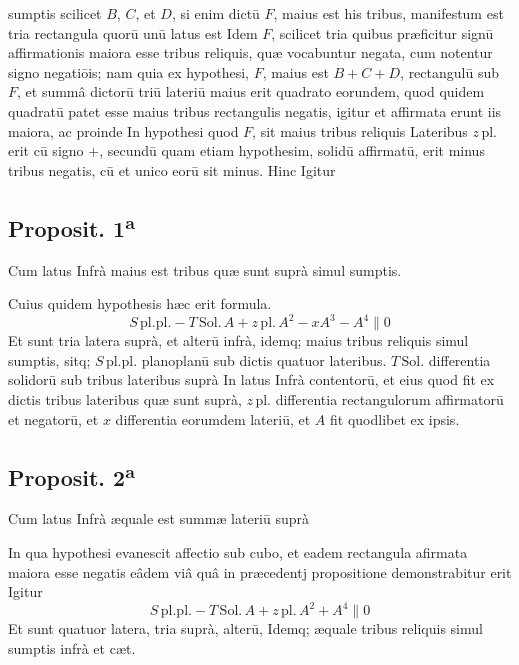 \documentclass[11pt,a4paper]{article}
\begin{document}

sumptis scilicet $B$, $C$, et $D$, si enim dictū $F$, maius est his tribus, manifestum est tria rectangula quorū unū latus est Idem $F$, scilicet tria quibus præficitur signū affirmationis maiora esse tribus reliquis, quæ vocabuntur negata, cum notentur signo negatiōis; nam quia ex hypothesi, $F$, maius est $B + C + D$, rectangulū sub $F$, et summâ dictorū triū lateriū maius erit quadrato eorundem, quod quidem quadratū patet esse maius tribus rectangulis negatis, igitur et affirmata erunt iis maiora, ac proinde In hypothesi quod $F$, sit maius tribus reliquis Lateribus $z\,\mathrm{pl.}$ erit cū signo $+$, secundū quam etiam hypothesim, solidū affirmatū, erit minus tribus negatis, cū et unico eorū sit minus. Hinc Igitur

\subsection*{Proposit. 1\textsuperscript{a}}

Cum latus Infrà maius est tribus quæ sunt suprà simul sumptis.

Cuius quidem hypothesis hæc erit formula.
\[ S\,\mathrm{pl.pl.} - T\,\mathrm{Sol.}\,A + z\,\mathrm{pl.}\,A^{2} - xA^{3} - A^{4} \parallel 0 \]
Et sunt tria latera suprà, et alterū infrà, idemq; maius tribus reliquis simul sumptis, sitq; $S\,\mathrm{pl.pl.}$ planoplanū sub dictis quatuor lateribus. $T\,\mathrm{Sol.}$ differentia solidorū sub tribus lateribus suprà In latus Infrà contentorū, et eius quod fit ex dictis tribus lateribus quæ sunt suprà, $z\,\mathrm{pl.}$ differentia rectangulorum affirmatorū et negatorū, et $x$ differentia eorumdem lateriū, et $A$ fit quodlibet ex ipsis.

\subsection*{Proposit. 2\textsuperscript{a}}

Cum latus Infrà æquale est summæ lateriū suprà

In qua hypothesi evanescit affectio sub cubo, et eadem rectangula afirmata maiora esse negatis eâdem viâ quâ in præcedentj propositione demonstrabitur erit Igitur
\[ S\,\mathrm{pl.pl.} - T\,\mathrm{Sol.}\,A + z\,\mathrm{pl.}\,A^{2} + A^{4} \parallel 0 \]
Et sunt quatuor latera, tria suprà, alterū, Idemq; æquale tribus reliquis simul sumptis infrà et cæt.
\end{document}
